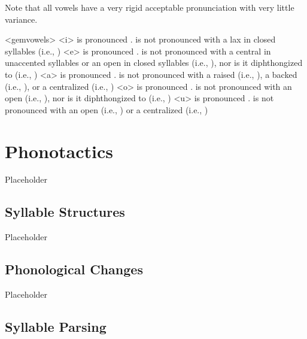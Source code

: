 Note that all \langtvk{} vowels have a very rigid acceptable pronunciation with very little variance.

\pex<gemvowels>
	   is pronounced .  is not pronounced with a lax  in closed syllables (i.e., )
	   is pronounced .  is not pronounced with a central  in unaccented syllables or an open  in closed syllables (i.e., ), nor is it diphthongized to  (i.e., )
	   is pronounced .  is not pronounced with a raised  (i.e., ), a backed  (i.e., ), or a centralized  (i.e., )
	   is pronounced .  is not pronounced with an open  (i.e., ), nor is it diphthongized to  (i.e., )
	   is pronounced .  is not pronounced with an open  (i.e., ) or a centralized  (i.e., )
\xe

\section{\langtvk{} Phonotactics}
\label{sec:tvk-phonotactics}

Placeholder

\subsection{Syllable Structures}
\label{subsec:tvk-syll-struc}

Placeholder

\subsection{Phonological Changes}
\label{subsec:tvk-phone-changes}

Placeholder

\subsection{Syllable Parsing}
\label{subsec:tvk-syll-parse}

